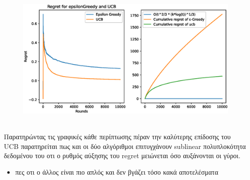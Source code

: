 \begin{figure}[h]
	\centering
		\centering
		\includegraphics[width=.6\linewidth]{Images/Regret10_10000.eps} 
		\label{fig:epsilon_10000}
\end{figure}


\noindent\\
Παρατηρώντας τις γραφικές κάθε περίπτωσης πέραν την καλύτερης επίδοσης του UCB παρατηρείται πως και οι δύο αλγόριθμοι επιτυγχάνουν sublinear πολυπλοκότητα δεδομένου του οτι ο ρυθμός αύξησης του regret μειώνεται όσο αυξάνονται οι γύροι.
\clearpage

\begin{itemize}
	\item πες οτι ο άλλος είναι πιο απλός και δεν βγάζει τόσο κακά αποτελέσματα
\end{itemize}